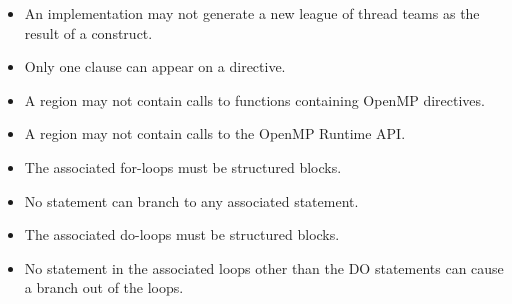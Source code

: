 \begin{itemize}
  \item An implementation may not generate a new league of thread teams
    as the result of a  construct.

  \item Only one  clause can appear on a  directive.


  \item A  region may not contain calls to functions containing
    OpenMP directives. %


  \item A  region may not contain calls to the OpenMP Runtime
    API.

\end{itemize}

\begin{ccppspecific}
\begin{itemize}

  \item The associated for-loops must be structured blocks.

  \item No statement can branch to any associated  statement.

\end{itemize}

\end{ccppspecific}

\begin{fortranspecific}
\begin{itemize}

  \item The associated do-loops must be structured blocks.

  \item No statement in the associated loops other than the DO statements can cause
    a branch out of the loops.


\end{itemize}
\end{fortranspecific}

